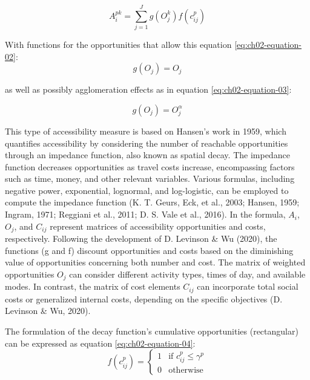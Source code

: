 \documentclass[
11pt, %
oneside, %
english, %
singlespacing, %
]{macthesis} %
\begin{document}
\begin{equation}
A^{pk}_i = \sum _{j=1} ^ {J} g(O^ k_{j}) f(c^p_{ij})
\label{eq:ch02-equation-01}
\end{equation}

With functions for the opportunities that allow this equation \ref{eq:ch02-equation-02}:
\begin{equation}
g(O_j) = O_j
\label{eq:ch02-equation-02}
\end{equation}

\noindent as well as possibly agglomeration effects as in equation \ref{eq:ch02-equation-03}:

\begin{equation}
g(O_j) = O^\alpha_j
\label{eq:ch02-equation-03}
\end{equation}

This type of accessibility measure is based on Hansen's work in 1959, which quantifies accessibility by considering the number of reachable opportunities through an impedance function, also known as spatial decay. The impedance function decreases opportunities as travel costs increase, encompassing factors such as time, money, and other relevant variables. Various formulas, including negative power, exponential, lognormal, and log-logistic, can be employed to compute the impedance function (K. T. Geurs, Eck, et al., 2003; Hansen, 1959; Ingram, 1971; Reggiani et al., 2011; D. S. Vale et al., 2016). In the formula, \(A_i\), \(O_j\), and \(C_{ij}\) represent matrices of accessibility opportunities and costs, respectively. Following the development of D. Levinson \& Wu (2020), the functions (g and f) discount opportunities and costs based on the diminishing value of opportunities concerning both number and cost. The matrix of weighted opportunities \(O_j\) can consider different activity types, times of day, and available modes. In contrast, the matrix of cost elements \(C_{ij}\) can incorporate total social costs or generalized internal costs, depending on the specific objectives (D. Levinson \& Wu, 2020).

The formulation of the decay function's cumulative opportunities (rectangular) can be expressed as equation \ref{eq:ch02-equation-04}:
\begin{equation}
f(c^p_{ij}) = 
\begin{cases}
  1 & \text{if } c^p_{ij} \le \gamma^p \\
  0 & \text{otherwise}
\end{cases}
\label{eq:ch02-equation-04}
\end{equation}
\end{document}
